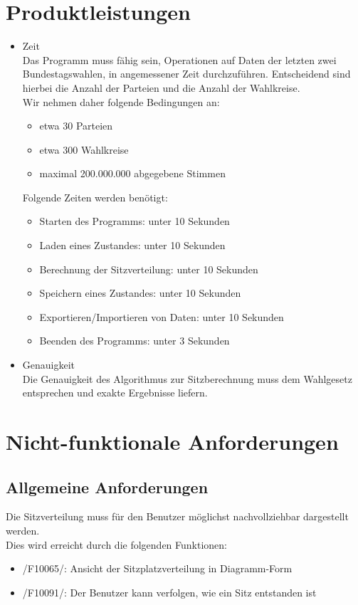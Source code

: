 \documentclass[10pt,a4paper]{article}
\begin{document}
\section{Produktleistungen}
\begin{itemize}
	\item Zeit \hfill \\
	Das Programm muss fähig sein, Operationen auf Daten der letzten zwei Bundestagswahlen, in angemessener Zeit durchzuführen. Entscheidend sind hierbei die Anzahl der Parteien und die Anzahl der Wahlkreise.
	\\ Wir nehmen daher folgende Bedingungen an:
	\begin{itemize}
		\item etwa 30 Parteien
		\item etwa 300 Wahlkreise
		\item maximal 200.000.000 abgegebene Stimmen
	\end{itemize}
	Folgende Zeiten werden benötigt:
	\begin{itemize}
		\item Starten des Programms: unter 10 Sekunden
		\item Laden eines Zustandes: unter 10 Sekunden
		\item Berechnung der Sitzverteilung: unter 10 Sekunden
		\item Speichern eines Zustandes: unter 10 Sekunden
		\item Exportieren/Importieren von Daten: unter 10 Sekunden
		\item Beenden des Programms: unter 3 Sekunden
	\end{itemize}
	\item Genauigkeit \hfill \\
	Die Genauigkeit des Algorithmus zur Sitzberechnung muss dem Wahlgesetz entsprechen und exakte Ergebnisse liefern.
\end{itemize}


\section{Nicht-funktionale Anforderungen}
\subsection{Allgemeine Anforderungen}
Die Sitzverteilung muss für den Benutzer möglichst nachvollziehbar dargestellt werden. \hfill \\
Dies wird erreicht durch die folgenden Funktionen:
\begin{itemize}
	\item /F10065/: Ansicht der Sitzplatzverteilung in Diagramm-Form
	\item /F10091/: Der Benutzer kann verfolgen, wie ein Sitz entstanden ist
\end{itemize}
\end{document}
